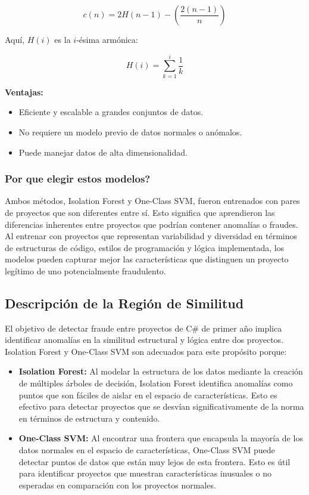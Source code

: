 \[
c(n) = 2H(n-1) - \left( \frac{2(n-1)}{n} \right)
\]

Aquí, \( H(i) \) es la \( i \)-ésima armónica:

\[
H(i) = \sum_{k=1}^{i} \frac{1}{k}
\]

\textbf{Ventajas:}
\begin{itemize}
    \item Eficiente y escalable a grandes conjuntos de datos.
    \item No requiere un modelo previo de datos normales o anómalos.
    \item Puede manejar datos de alta dimensionalidad.
\end{itemize}


\subsubsection{Por que elegir estos modelos?}

Ambos métodos, Isolation Forest y One-Class SVM, fueron entrenados con pares de proyectos que son diferentes entre sí. Esto significa que aprendieron las diferencias inherentes entre proyectos que podrían contener anomalías o fraudes. Al entrenar con proyectos que representan variabilidad y diversidad en términos de estructuras de código, estilos de programación y lógica implementada, los modelos pueden capturar mejor las características que distinguen un proyecto legítimo de uno potencialmente fraudulento.

\subsection*{Descripción de la Región de Similitud}

El objetivo de detectar fraude entre proyectos de C\# de primer año implica identificar anomalías en la similitud estructural y lógica entre dos proyectos. Isolation Forest y One-Class SVM son adecuados para este propósito porque:

\begin{itemize}
    \item \textbf{Isolation Forest:} Al modelar la estructura de los datos mediante la creación de múltiples árboles de decisión, Isolation Forest identifica anomalías como puntos que son fáciles de aislar en el espacio de características. Esto es efectivo para detectar proyectos que se desvían significativamente de la norma en términos de estructura y contenido.
    
    \item \textbf{One-Class SVM:} Al encontrar una frontera que encapsula la mayoría de los datos normales en el espacio de características, One-Class SVM puede detectar puntos de datos que están muy lejos de esta frontera. Esto es útil para identificar proyectos que muestran características inusuales o no esperadas en comparación con los proyectos normales.
\end{itemize}


